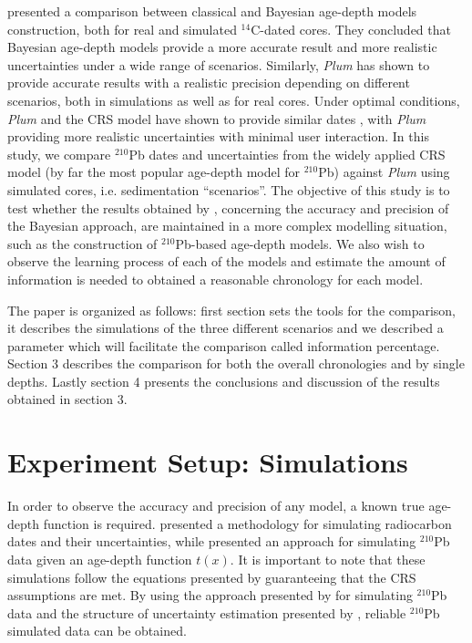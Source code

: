 \documentclass [10pt] {article}
\begin{document}
\citet{Blaauw2018} presented a comparison between classical and Bayesian age-depth models construction, both for real and simulated $^{14}$C-dated cores.
They concluded that Bayesian age-depth models provide a more accurate result and more realistic uncertainties under a wide range of scenarios.  
Similarly, \textit{Plum} has shown to provide accurate results with a realistic precision depending on different scenarios, both in simulations as well as for real cores. Under optimal conditions, \textit{Plum} and the CRS model have shown to provide similar dates , with \textit{Plum} providing more realistic uncertainties with minimal user interaction. 
In this study, we compare $^{210}$Pb dates and uncertainties from the widely applied CRS model (by far the most popular age-depth model for $^{210}$Pb) against \textit{Plum} using simulated cores, i.e. sedimentation ``scenarios''.
The objective of this study is to test whether the results obtained by \citet{Blaauw2018}, concerning the accuracy and precision of the Bayesian approach, are maintained in a more complex modelling situation, such as the construction of $^{210}$Pb-based age-depth models.
We also wish to observe the learning process of each of the models and estimate the amount of information is needed to obtained a reasonable chronology for each model. 

The paper is organized as follows: first section sets the tools for the comparison, it describes the simulations of the three different scenarios and we described a parameter which will facilitate the comparison called information percentage. 
Section 3 describes the comparison for both the overall chronologies and by single depths.
Lastly section 4 presents the conclusions and discussion of the results obtained in section 3. 



\section{Experiment Setup: Simulations}

	In order to observe the accuracy and precision of any model, a known true age-depth function is required.
\citet{Blaauw2018} presented a methodology for simulating radiocarbon dates and their uncertainties, while \citet{Aquino2018} presented an approach for simulating $^{210}$Pb data given an age-depth function $t(x)$.
It is important to note that these simulations follow the equations presented by \cite{Appleby1978, Robbins1978} guaranteeing that the CRS assumptions are met. 
By using the approach presented by \citet{Aquino2018} for simulating $^{210}$Pb data and the structure of uncertainty estimation presented by \citet{Blaauw2018}, reliable $^{210}$Pb simulated data can be obtained.
\end{document}
